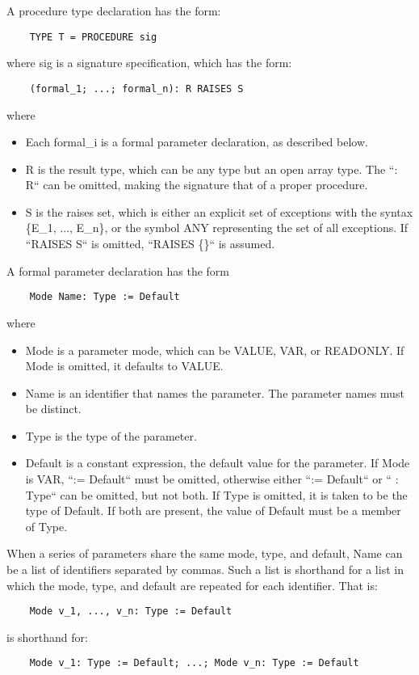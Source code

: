 \documentclass[10pt]{article}
\begin{document}
  A procedure type declaration has the form: 
\begin{verbatim}
    TYPE T = PROCEDURE sig
\end{verbatim}
 where sig is a signature specification, which has the form: 
\begin{verbatim}
    (formal_1; ...; formal_n): R RAISES S
\end{verbatim}
 where 
\begin{itemize}
\item  Each formal\_i is a formal parameter declaration, as described below. 
\item R is the result type, which can be any type but an open array type. The ``: R`` can be omitted, making the signature that of a proper procedure. 
\item S is the raises set, which is either an explicit set of exceptions with the syntax \{E\_1, ..., E\_n\}, or the symbol ANY representing the set of all exceptions. If ``RAISES S`` is omitted, ``RAISES \{\}`` is assumed. 
\end{itemize}



  A formal parameter declaration has the form 
\begin{verbatim}
    Mode Name: Type := Default
\end{verbatim}
 where
\begin{itemize}
\item Mode is a parameter mode, which can be VALUE, VAR, or READONLY. If Mode is omitted, it defaults to VALUE. 
\item Name is an identifier that names the parameter. The parameter names must be distinct. 
\item Type is the type of the parameter. 
\item Default is a constant expression, the default value for the parameter. If Mode is VAR, ``:= Default`` must be omitted, otherwise either ``:= Default`` or `` : Type`` can be omitted, but not both. If Type is omitted, it is taken to be the type of Default. If both are present, the value of Default must be a member of Type. 
\end{itemize}



  When a series of parameters share the same mode, type, and default, Name can be a list of identifiers separated by commas. Such a list is shorthand for a list in which the mode, type, and default are repeated for each identifier. That is: 
\begin{verbatim}
    Mode v_1, ..., v_n: Type := Default
\end{verbatim}
 is shorthand for: 
\begin{verbatim}
    Mode v_1: Type := Default; ...; Mode v_n: Type := Default
\end{verbatim}
\end{document}
